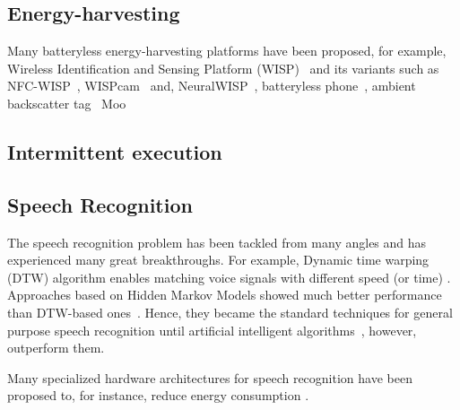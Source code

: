 \subsection{Energy-harvesting}
Many batteryless energy-harvesting platforms have been proposed, for example, Wireless Identification and Sensing Platform (WISP)~\cite{smith_ubicomp_2006} and its variants such as NFC-WISP~\cite{zhao2015nfc}, WISPcam~\cite{naderiparizi_rfid_2015} and, NeuralWISP~\cite{yeager2009neuralwisp}, batteryless phone~\cite{talla2017battery}, ambient backscatter tag~\cite{liu2013ambient} Moo~\cite{moo}

\subsection{Intermittent execution}

\subsection{Speech Recognition}
The speech recognition problem has been tackled from many angles and has experienced many great breakthroughs. For example, Dynamic time warping (DTW) algorithm enables matching voice signals with different speed (or time) \cite{}. Approaches based on Hidden Markov Models showed much better performance than DTW-based ones~\cite{jelinek1997statistical}. Hence, they became the standard techniques for general purpose speech recognition until artificial intelligent algorithms~\cite{hinton2012deep}, however, outperform them. 

Many specialized hardware architectures for speech recognition have been proposed to, for instance, reduce energy consumption \cite{price2018low,price20156}. 
